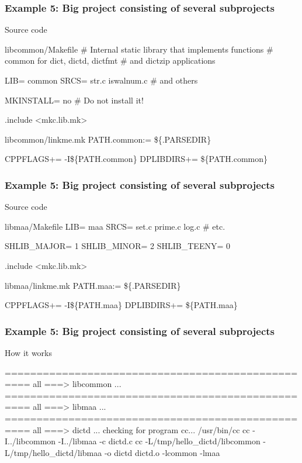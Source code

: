 \documentclass[hyperref={colorlinks=true}]{beamer}
\begin{document}
\begin{frame}[fragile]
  \frametitle{Example 5: Big project consisting of several subprojects}

  \begin{block}{Source code}
  \begin{Code}{libcommon/Makefile}
# Internal static library that implements functions
# common for dict, dictd, dictfmt
# and dictzip applications

LIB=            common
SRCS=           str.c iswalnum.c # and others

MKINSTALL=      no # Do not install it!

.include <mkc.lib.mk>
  \end{Code}
  \begin{Code}{libcommon/linkme.mk}
PATH.common:=      \$\{.PARSEDIR\}

CPPFLAGS+=      -I\$\{PATH.common\}
DPLIBDIRS+=     \$\{PATH.common\}
  \end{Code}
  \end{block}
\end{frame}

\begin{frame}[fragile]
  \frametitle{Example 5: Big project consisting of several subprojects}

  \begin{block}{Source code}
  \begin{Code}{libmaa/Makefile}
LIB=            maa
SRCS=           set.c prime.c log.c # etc.

SHLIB_MAJOR=    1
SHLIB_MINOR=    2
SHLIB_TEENY=    0

.include <mkc.lib.mk>
  \end{Code}
  \begin{Code}{libmaa/linkme.mk}
PATH.maa:=      \$\{.PARSEDIR\}

CPPFLAGS+=      -I\$\{PATH.maa\}
DPLIBDIRS+=     \$\{PATH.maa\}
  \end{Code}
  \end{block}
\end{frame}

\begin{frame}[fragile]
  \frametitle{Example 5: Big project consisting of several subprojects}

  \begin{block}{How it works}
  \begin{CodeNoLabel}
==================================================
all ===> libcommon
...
==================================================
all ===> libmaa
...
==================================================
all ===> dictd
...
checking for program cc... /usr/bin/cc
cc -I../libcommon -I../libmaa  -c dictd.c
cc -L/tmp/hello_dictd/libcommon -L/tmp/hello_dictd/libmaa 
    -o dictd dictd.o -lcommon -lmaa
\prompt{\$}
  \end{CodeNoLabel}
  \end{block}
\end{frame}
\end{document}
